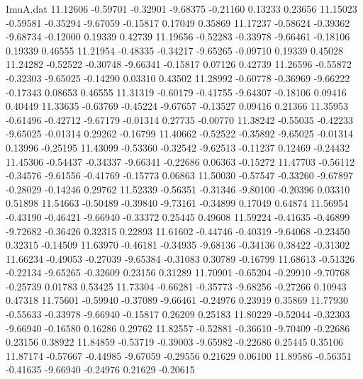 \begin{filecontents}{ImuA.dat}
  11.12606   -0.59701   -0.32901   -9.68375   -0.21160    0.13233    0.23656
  11.15023   -0.59581   -0.35294   -9.67059   -0.15817    0.17049    0.35869
  11.17237   -0.58624   -0.39362   -9.68734   -0.12000    0.19339    0.42739
  11.19656   -0.52283   -0.33978   -9.66461   -0.18106    0.19339    0.46555
  11.21954   -0.48335   -0.34217   -9.65265   -0.09710    0.19339    0.45028
  11.24282   -0.52522   -0.30748   -9.66341   -0.15817    0.07126    0.42739
  11.26596   -0.55872   -0.32303   -9.65025   -0.14290    0.03310    0.43502
  11.28992   -0.60778   -0.36969   -9.66222   -0.17343    0.08653    0.46555
  11.31319   -0.60179   -0.41755   -9.64307   -0.18106    0.09416    0.40449
  11.33635   -0.63769   -0.45224   -9.67657   -0.13527    0.09416    0.21366
  11.35953   -0.61496   -0.42712   -9.67179   -0.01314    0.27735   -0.00770
  11.38242   -0.55035   -0.42233   -9.65025   -0.01314    0.29262   -0.16799
  11.40662   -0.52522   -0.35892   -9.65025   -0.01314    0.13996   -0.25195
  11.43099   -0.53360   -0.32542   -9.62513   -0.11237    0.12469   -0.24432
  11.45306   -0.54437   -0.34337   -9.66341   -0.22686    0.06363   -0.15272
  11.47703   -0.56112   -0.34576   -9.61556   -0.41769   -0.15773    0.06863
  11.50030   -0.57547   -0.33260   -9.67897   -0.28029   -0.14246    0.29762
  11.52339   -0.56351   -0.31346   -9.80100   -0.20396    0.03310    0.51898
  11.54663   -0.50489   -0.39840   -9.73161   -0.34899    0.17049    0.64874
  11.56954   -0.43190   -0.46421   -9.66940   -0.33372    0.25445    0.49608
  11.59224   -0.41635   -0.46899   -9.72682   -0.36426    0.32315    0.22893
  11.61602   -0.44746   -0.40319   -9.64068   -0.23450    0.32315   -0.14509
  11.63970   -0.46181   -0.34935   -9.68136   -0.34136    0.38422   -0.31302
  11.66234   -0.49053   -0.27039   -9.65384   -0.31083    0.30789   -0.16799
  11.68613   -0.51326   -0.22134   -9.65265   -0.32609    0.23156    0.31289
  11.70901   -0.65204   -0.29910   -9.70768   -0.25739    0.01783    0.53425
  11.73304   -0.66281   -0.35773   -9.68256   -0.27266    0.10943    0.47318
  11.75601   -0.59940   -0.37089   -9.66461   -0.24976    0.23919    0.35869
  11.77930   -0.55633   -0.33978   -9.66940   -0.15817    0.26209    0.25183
  11.80229   -0.52044   -0.32303   -9.66940   -0.16580    0.16286    0.29762
  11.82557   -0.52881   -0.36610   -9.70409   -0.22686    0.23156    0.38922
  11.84859   -0.53719   -0.39003   -9.65982   -0.22686    0.25445    0.35106
  11.87174   -0.57667   -0.44985   -9.67059   -0.29556    0.21629    0.06100
  11.89586   -0.56351   -0.41635   -9.66940   -0.24976    0.21629   -0.20615

\end{filecontents}
